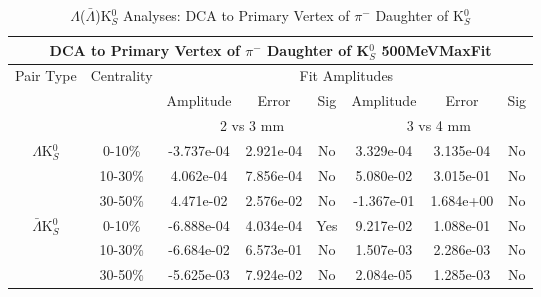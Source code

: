 \documentclass[../AnalysisNoteJBuxton.tex]{subfiles}
\begin{document}
\begin{table}
 \centering
 \begin{tabular}{|c|c|c|c|c||c|c|c|}
  \multicolumn{8}{c}{DCA to Primary Vertex of $\pi^{-}$ Daughter of K$^{0}_{S}$ 500MeVMaxFit} \\
  \hline
  \multirow{3}{*}{Pair Type} & \multirow{3}{*}{Centrality} & \multicolumn{6}{c|}{Fit Amplitudes} \\
  \cline{3-8}
   & & Amplitude & Error & Sig & Amplitude & Error & Sig \\  
  \cline{3-8}
   & & \multicolumn{3}{c||}{2 vs 3 mm} & \multicolumn{3}{c|}{3 vs 4 mm} \\  
  \hline  
  \multirow{3}{*}{$\Lambda$K$^{0}_{S}$}  
   &  0-10\% & -3.737e-04 & 2.921e-04 & No & 3.329e-04 & 3.135e-04 & No \\
   & 10-30\% & 4.062e-04 & 7.856e-04 & No & 5.080e-02 & 3.015e-01 & No \\
   & 30-50\% & 4.471e-02 & 2.576e-02 & No & -1.367e-01 & 1.684e+00 & No \\
  \hline  
  \multirow{3}{*}{$\bar{\Lambda}$K$^{0}_{S}$}  
   &  0-10\% & -6.888e-04 & 4.034e-04 & Yes & 9.217e-02 & 1.088e-01 & No \\
   & 10-30\% & -6.684e-02 & 6.573e-01 & No & 1.507e-03 & 2.286e-03 & No \\
   & 30-50\% & -5.625e-03 & 7.924e-02 & No & 2.084e-05 & 1.285e-03 & No \\
  \hline
 \end{tabular}
 \caption{$\Lambda$($\bar{\Lambda}$)K$^{0}_{S}$ Analyses: DCA to Primary Vertex of $\pi^{-}$ Daughter of K$^{0}_{S}$}
 \label{tab:DcaToPrimVertexNegPionDaughtOfK0LamK0_500MeVMaxFit}
\end{table}
\end{document}
